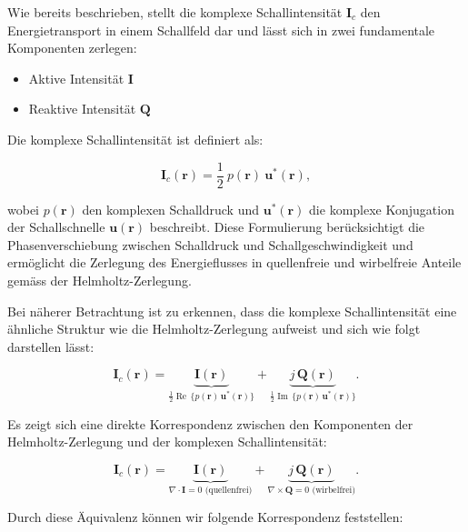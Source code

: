 Wie bereits beschrieben, stellt die komplexe Schallintensität $\mathbf{I}_c$ den Energietransport in einem Schallfeld dar und lässt sich in zwei fundamentale Komponenten zerlegen:
 
\begin{itemize}
\item Aktive Intensität $\mathbf{I}$
\item Reaktive Intensität $\mathbf{Q}$
\end{itemize}
 
\noindent Die komplexe Schallintensität ist definiert als:
 
\begin{equation}
\mathbf{I}_c (\mathbf{r}) = \frac{1}{2} \: p(\mathbf{r}) \: \mathbf{u}^{*}(\mathbf{r}),
\end{equation}
 
\noindent wobei $p(\mathbf{r})$ den komplexen Schalldruck und $\mathbf{u}^{*}(\mathbf{r})$ die komplexe Konjugation der Schallschnelle $\mathbf{u}(\mathbf{r})$ beschreibt. Diese Formulierung berücksichtigt die Phasenverschiebung zwischen Schalldruck und Schallgeschwindigkeit und ermöglicht die Zerlegung des Energieflusses in quellenfreie und wirbelfreie Anteile gemäss der Helmholtz-Zerlegung.
 
Bei näherer Betrachtung ist zu erkennen, dass die komplexe Schallintensität eine ähnliche Struktur wie die Helmholtz-Zerlegung aufweist und sich wie folgt darstellen lässt:
 
\begin{equation}
\mathbf{I}_c (\mathbf{r}) = \underbrace{\mathbf{I}(\mathbf{r})}_{\frac{1}{2} \operatorname{Re} \, \{ p(\mathbf{r}) \, \mathbf{u}^*(\mathbf{r}) \}} + \underbrace{j\,\mathbf{Q}(\mathbf{r})}_{\frac{1}{2} \operatorname{Im} \, \{ p(\mathbf{r}) \, \mathbf{u}^*(\mathbf{r}) \}}.
\end{equation}
 
\noindent Es zeigt sich eine direkte Korrespondenz zwischen den Komponenten der Helmholtz-Zerlegung und der komplexen Schallintensität:
 
\begin{equation}
\mathbf{I}_c (\mathbf{r}) = \underbrace{\mathbf{I}(\mathbf{r})}_{\nabla \cdot \mathbf{I} = 0 \text{ (quellenfrei)}} + \underbrace{j\,\mathbf{Q}(\mathbf{r})}_{\nabla \times \mathbf{Q} = 0 \text{ (wirbelfrei)}}.
\end{equation}
 
\noindent Durch diese Äquivalenz können wir folgende Korrespondenz feststellen:
 
